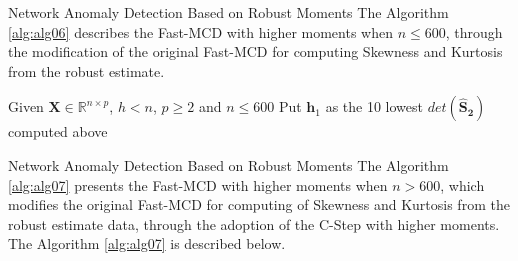 \documentclass[newPxFont, numfooter, sectionpages]{beamer}
\begin{document}
\begin{frame}[c]{Network Anomaly Detection Based on Robust Moments}
    The Algorithm \ref{alg:alg06} describes the Fast-MCD with higher moments when $n \leq 600$, through the modification of the original Fast-MCD for computing Skewness and Kurtosis from the robust estimate.
    
	\begin{algorithm}[H]\label{alg:alg06}
		\scriptsize
		\SetAlgoLined
		Given $\boldsymbol{X} \in \mathbb{R}^{n \times p}$, $h < n$, $p \geq 2$ and $n \leq 600$\;
		Put $\boldsymbol{h}_1$ as the 10 lowest $det(\boldsymbol{\hat{S}_2})$ computed above\;
		\caption{Fast-MCD with higher moments when $n \leq 600$}
	\end{algorithm}
\end{frame}

\begin{frame}[c]{Network Anomaly Detection Based on Robust Moments}
	The Algorithm \ref{alg:alg07} presents the Fast-MCD with higher moments when $n > 600$, which modifies the original Fast-MCD for computing of Skewness and Kurtosis from the robust estimate data, through the adoption of the C-Step with higher moments. The Algorithm \ref{alg:alg07} is described below.
\end{frame}
\end{document}
